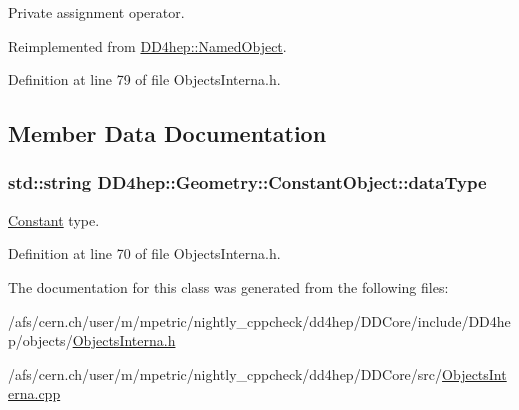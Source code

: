 Private assignment operator. 

Reimplemented from \hyperlink{class_d_d4hep_1_1_named_object_a474ed41e8d8b480401671dfe07b33eb6}{DD4hep::NamedObject}.

Definition at line 79 of file ObjectsInterna.h.

\subsection{Member Data Documentation}
\hypertarget{class_d_d4hep_1_1_geometry_1_1_constant_object_afa7868ea6bab516b7cd63ac1c9537e5c}{
\subsubsection[{dataType}]{\setlength{\rightskip}{0pt plus 5cm}std::string {\bf DD4hep::Geometry::ConstantObject::dataType}}}
\label{class_d_d4hep_1_1_geometry_1_1_constant_object_afa7868ea6bab516b7cd63ac1c9537e5c}


\hyperlink{class_d_d4hep_1_1_geometry_1_1_constant}{Constant} type. 

Definition at line 70 of file ObjectsInterna.h.

The documentation for this class was generated from the following files:\begin{DoxyCompactItemize}
\item 
/afs/cern.ch/user/m/mpetric/nightly\_\-cppcheck/dd4hep/DDCore/include/DD4hep/objects/\hyperlink{_objects_interna_8h}{ObjectsInterna.h}\item 
/afs/cern.ch/user/m/mpetric/nightly\_\-cppcheck/dd4hep/DDCore/src/\hyperlink{_objects_interna_8cpp}{ObjectsInterna.cpp}\end{DoxyCompactItemize}
